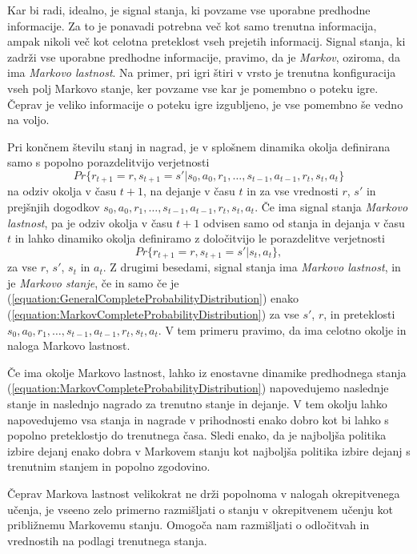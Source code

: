 \documentclass[a4paper, oneside, 12pt]{report}
\begin{document}
Kar bi radi, idealno, je signal stanja, ki povzame vse uporabne predhodne informacije. Za to je ponavadi potrebna več kot samo trenutna informacija, ampak nikoli več kot celotna preteklost vseh prejetih informacij. Signal stanja, ki zadrži vse uporabne predhodne informacije, pravimo, da je {\em Markov}, oziroma, da ima {\em Markovo lastnost}. Na primer, pri igri štiri v vrsto je trenutna konfiguracija vseh polj Markovo stanje, ker povzame vse kar je pomembno o poteku igre. Čeprav je veliko informacije o poteku igre izgubljeno, je vse pomembno še vedno na voljo.

Pri končnem številu stanj in nagrad, je v splošnem dinamika okolja definirana samo s popolno porazdelitvijo verjetnosti
\begin{equation} \label{equation:GeneralCompleteProbabilityDistribution}
Pr\{r_{t+1} = r, s_{t+1} = s' | s_0, a_0, r_1, \dots, s_{t-1}, a_{t-1}, r_t, s_t, a_t\}
\end{equation}
na odziv okolja v času $t+1$, na dejanje v času $t$ in za vse vrednosti $r$, $s'$ in prejšnjih dogodkov $s_0, a_0, r_1, \dots, s_{t-1}, a_{t-1}, r_t, s_t, a_t$. Če ima signal stanja {\em Markovo lastnost}, pa je odziv okolja v času $t+1$ odvisen samo od stanja in dejanja v času $t$ in lahko dinamiko okolja definiramo z določitvijo le porazdelitve verjetnosti
\begin{equation} \label{equation:MarkovCompleteProbabilityDistribution}
Pr\{r_{t+1} = r, s_{t+1} = s' | s_t, a_t\},
\end{equation}
za vse $r$, $s'$, $s_t$ in $a_t$. Z drugimi besedami, signal stanja ima {\em Markovo lastnost}, in je {\em Markovo stanje}, če in samo če je (\ref{equation:GeneralCompleteProbabilityDistribution}) enako (\ref{equation:MarkovCompleteProbabilityDistribution}) za vse $s'$, $r$, in preteklosti $s_0, a_0, r_1, \dots, s_{t-1}, a_{t-1}, r_t, s_t, a_t$. V tem primeru pravimo, da ima celotno okolje in naloga Markovo lastnost.

Če ima okolje Markovo lastnost, lahko iz enostavne dinamike predhodnega stanja (\ref{equation:MarkovCompleteProbabilityDistribution}) napovedujemo naslednje stanje in naslednjo nagrado za trenutno stanje in dejanje. V tem okolju lahko napovedujemo vsa stanja in nagrade v prihodnosti enako dobro kot bi lahko s popolno preteklostjo do trenutnega časa. Sledi enako, da je najboljša politika izbire dejanj enako dobra v Markovem stanju kot najboljša politika izbire dejanj s trenutnim stanjem in popolno zgodovino.

Čeprav Markova lastnost velikokrat ne drži popolnoma v nalogah okrepitvenega učenja, je vseeno zelo primerno razmišljati o stanju v okrepitvenem učenju kot približnemu Markovemu stanju. Omogoča nam razmišljati o odločitvah in vrednostih na podlagi trenutnega stanja.
\end{document}
